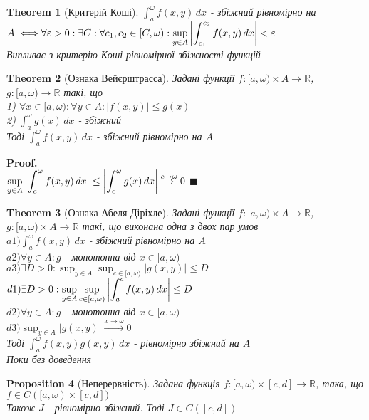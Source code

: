 \documentclass[a4paper, 14pt]{extarticle}
\def\huge{\displaystyle}
\def\bigline{\vspace{5mm}\\}
\theoremstyle{theoremdd}
\newtheorem{theorem}{Theorem}[subsection]
\theoremstyle{theoremdd}
\theoremstyle{theoremdd}
\newtheorem{proposition}[theorem]{Proposition}
\theoremstyle{theoremdd}
\theoremstyle{theoremdd}
\theoremstyle{theoremdd}
\theoremstyle{theoremdd}
\newenvironment{pf}{\vspace*{-3mm} \textbf{Proof. \\}}{$\blacksquare$}
\begin{document}
\begin{theorem}[Критерій Коші]
$\huge \int_a^\omega f(x,y)\,dx$ - збіжний рівномірно на $A \iff \\ \forall \varepsilon > 0: \exists C: \forall c_1,c_2 \in [C,\omega): \huge \sup_{y \in A} \abs{\int_{c_1}^{c_2} f(x,y)\,dx} < \varepsilon$\\
\textit{Випливає з критерію Коші рівномірної збіжності функцій}
\end{theorem}

\begin{theorem}[Ознака Вейєрштрасса]
Задані функції $f: [a,\omega) \times A \to \mathbb{R}$, $g: [a,\omega) \to \mathbb{R}$ такі, що\\
1) $\forall x \in [a,\omega): \forall y \in A: |f(x,y)| \leq g(x)$\\
2) $\huge \int_a^\omega g(x)\,dx$ - збіжний\\
Тоді $\huge \int_a^\omega f(x,y)\,dx$ - збіжний рівномірно на $A$
\end{theorem}

\begin{pf}
$\huge \sup_{y \in A} \abs{\int_c^\omega f(x,y)\,dx} \leq \abs{\int_c^\omega g(x)\,dx} \overset{c \to \omega}{\to} 0$
\end{pf}

\begin{theorem}[Ознака Абеля-Діріхле]
Задані функції $f: [a,\omega) \times A \to \mathbb{R}$, $g: [a,\omega) \times A \to \mathbb{R}$ такі, що виконана одна з двох пар умов\\
$a1) \huge \int_a^\omega f(x,y)\,dx$ - збіжний рівномірно на $A$\\
$a2) \forall y \in A: g$ - монотонна від $x \in [a,\omega)$\\
$a3) \exists D>0: \huge \sup_{y \in A} \sup_{c \in [a,\omega)} |g(x,y)| \leq D$
\bigline
$d1) \exists D>0: \huge \sup_{y \in A} \sup_{c \in [a,\omega)} \abs{\int_a^c f(x,y)\,dx} \leq D$\\
$d2) \forall y \in A: g$ - монотонна від $x \in [a,\omega)$\\
$d3) \huge \sup_{y \in A} |g(x,y)| \overset{x \to \omega}{\to} 0$\\
Тоді $\huge \int_a^\omega f(x,y) g(x,y)\,dx$ - рівномірно збіжний на $A$\\
\textit{Поки без доведення}
\end{theorem}

\begin{proposition}[Неперервність]
Задана функція $f: [a,\omega) \times [c,d] \to \mathbb{R}$, така, що $f \in C([a,\omega) \times [c,d])$\\
Також $J$ - рівномірно збіжний. Тоді $J \in C([c,d])$
\end{proposition}
\end{document}
